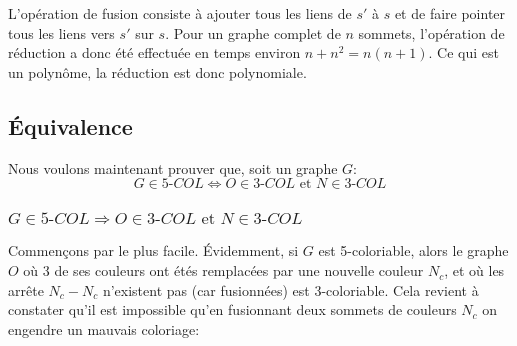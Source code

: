 \documentclass{article}
\newcommand\col[1]{\textit{#1-COL}}
\begin{document}
L'opération de fusion consiste à ajouter tous les liens de $s'$ à $s$ et de faire pointer tous les liens vers $s'$ sur $s$. Pour un graphe complet de $n$ sommets, l'opération de réduction a donc été effectuée en temps environ $n + n^2 = n(n+1)$. Ce qui est un polynôme, la réduction est donc polynomiale.

\subsection{Équivalence}
Nous voulons maintenant prouver que, soit un graphe $G$:
$$G \in \col{5} \Leftrightarrow O \in \col{3} \text{  et  } N \in \col{3}$$

\subsubsection{\normalfont $G \in \col{5} \Rightarrow O \in \col{3} \text{  et  } N \in \col{3}$}
Commençons par le plus facile. Évidemment, si $G$ est 5-coloriable, alors le graphe $O$ où 3 de ses couleurs ont étés remplacées par une nouvelle couleur $N_c$, et où les arrête $N_c-N_c$ n'existent pas (car fusionnées) est 3-coloriable. Cela revient à constater qu'il est impossible qu'en fusionnant deux sommets de couleurs $N_c$ on engendre un mauvais coloriage:

\begin{center}
  \hspace{2cm}
  \raisebox{42pt}{\Huge $\rightarrow$}
  \hspace{2cm}
\end{center}
\end{document}
